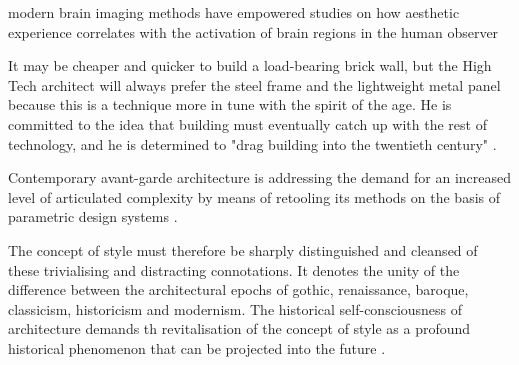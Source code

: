 


modern brain imaging methods have empowered studies on how aesthetic experience
correlates with the activation of brain regions in the human
observer



It may be cheaper and quicker to build a load-bearing brick wall, but
the High Tech architect will always prefer the steel frame and the lightweight metal panel because this is a technique more in tune with the spirit of the age.
He is committed to the idea that building must eventually catch up with the rest of technology, and he is determined to "drag building into the twentieth century" \cite{Davies1988}.

Contemporary avant-garde architecture is addressing the demand for an increased level of articulated complexity by means of retooling its methods on the basis of parametric design systems \cite{Schumacher2008}.

The concept of style must therefore be sharply distinguished and cleansed of these trivialising and distracting connotations.
It denotes the unity of the difference between the architectural epochs of gothic, renaissance, baroque, classicism, historicism and modernism.
The historical self-consciousness of architecture demands th revitalisation of the concept of style as a profound historical phenomenon that can be projected into the future \cite{Schumacher2010}.

